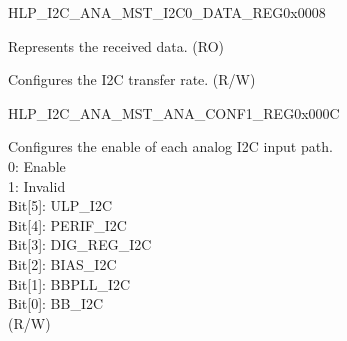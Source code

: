 \begin{register}{H}{LP\_I2C\_ANA\_MST\_I2C0\_DATA\_REG}{0x0008}\label{regdesc:LPI2CANAMSTI2C0DATAREG}
%
%
%
\regnewline%
\begin{regdesc}\begin{reglist}
\label{fielddesc:LPI2CANAMSTI2C0RDATA}\item [LP\_I2C\_ANA\_MST\_I2C0\_RDATA] Represents the received data. (RO)
\label{fielddesc:LPI2CANAMSTI2C0CLKSEL}\item [LP\_I2C\_ANA\_MST\_I2C0\_CLK\_SEL] Configures the I2C transfer rate. (R/W)
\end{reglist}\end{regdesc}
\end{register}


\begin{register}{H}{LP\_I2C\_ANA\_MST\_ANA\_CONF1\_REG}{0x000C}\label{regdesc:LPI2CANAMSTANACONF1REG}
%
%
\regnewline%
\begin{regdesc}\begin{reglist}
\label{fielddesc:LPI2CANAMSTANACONF1}\item [LP\_I2C\_ANA\_MST\_ANA\_CONF1] Configures the enable of each analog I2C input path. \\
0: Enable\\
1: Invalid\\
Bit[5]: ULP\_I2C\\
Bit[4]: PERIF\_I2C\\
Bit[3]: DIG\_REG\_I2C\\
Bit[2]: BIAS\_I2C\\
Bit[1]: BBPLL\_I2C\\
Bit[0]: BB\_I2C\\
(R/W)
\end{reglist}\end{regdesc}
\end{register}


